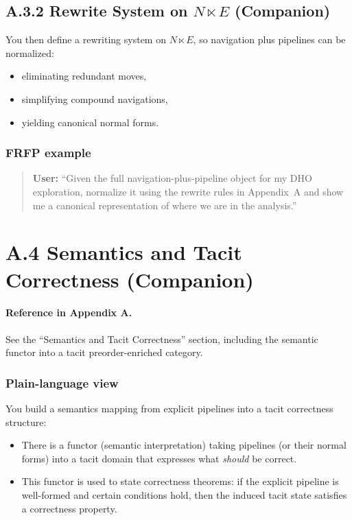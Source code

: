 \subsection{A.3.2 Rewrite System on $N \ltimes E$ (Companion)}

You then define a rewriting system on $N \ltimes E$, so navigation plus pipelines can be normalized:

\begin{itemize}
 \item eliminating redundant moves,
 \item simplifying compound navigations,
 \item yielding canonical normal forms.
\end{itemize}

\subsubsection*{FRFP example}

\begin{quote}
\textbf{User:} 
``Given the full navigation-plus-pipeline object for my DHO exploration, normalize it using the rewrite rules in Appendix~A and show me a canonical representation of where we are in the analysis.'' 
\end{quote}

\newpage

\section{A.4 Semantics and Tacit Correctness (Companion)}

\paragraph{Reference in Appendix A.}
See the ``Semantics and Tacit Correctness'' section, including the semantic functor into a tacit
preorder-enriched category.

\subsubsection*{Plain-language view}

You build a semantics mapping from explicit pipelines into a tacit correctness structure:

\begin{itemize}
 \item There is a functor (semantic interpretation) taking pipelines (or their normal forms) into
 a tacit domain that expresses what \emph{should} be correct.
 \item This functor is used to state correctness theorems:
 if the explicit pipeline is well-formed and certain conditions hold, then the induced tacit state
 satisfies a correctness property.
\end{itemize}

